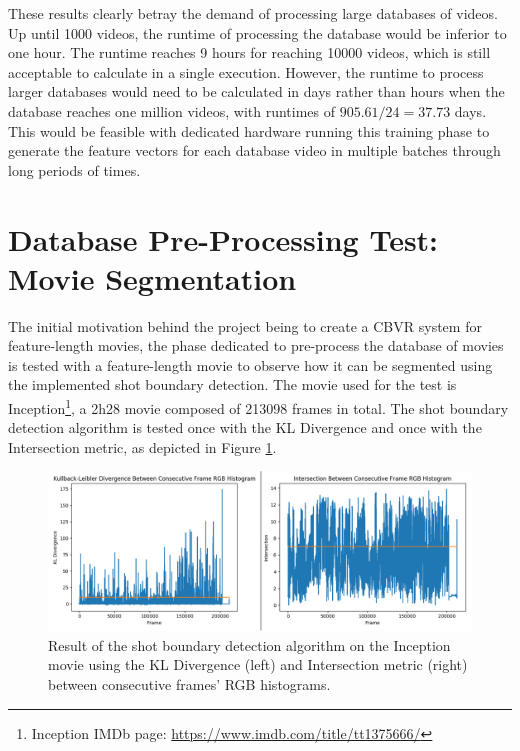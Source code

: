 These results clearly betray the demand of processing large databases of videos. Up until 1000 videos, the runtime of processing the database would be inferior to one hour. The runtime reaches 9 hours for reaching 10000 videos, which is still acceptable to calculate in a single execution. However, the runtime to process larger databases would need to be calculated in days rather than hours when the database reaches one million videos, with runtimes of $905.61/24=37.73$ days. This would be feasible with dedicated hardware running this training phase to generate the feature vectors for each database video in multiple batches through long periods of times.


\section{Database Pre-Processing Test: Movie Segmentation}
\label{sec:evaluation-movie-segmentation-test}

The initial motivation behind the project being to create a CBVR system for feature-length movies, the phase dedicated to pre-process the database of movies is tested with a feature-length movie to observe how it can be segmented using the implemented shot boundary detection. The movie used for the test is Inception\footnote{Inception IMDb page: \url{https://www.imdb.com/title/tt1375666/}}, a 2h28 movie composed of 213098 frames in total. The shot boundary detection algorithm is tested once with the KL Divergence and once with the Intersection metric, as depicted in Figure \ref{fig:evaluation-inception_shot_boundary_detection_test}.\\

\begin{figure}[h] 
\centerline{\includegraphics[width=1.15\textwidth]{figures/evaluation/inception_shot_boundary_detection_test.png}}
\caption{\label{fig:evaluation-inception_shot_boundary_detection_test}Result of the shot boundary detection algorithm on the Inception movie using the KL Divergence (left) and Intersection metric (right) between consecutive frames' RGB histograms.}
\end{figure}

